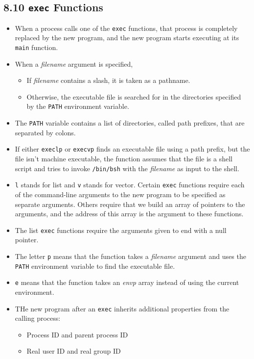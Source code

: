 \documentclass[]{article} \usepackage[all]{xy}
\newcommand{\code}{\texttt}
\begin{document}
\subsection*{8.10 \code{exec} Functions}
\begin{itemize}
\item When a process calls one of the \code{exec} functions, that process is
completely replaced by the new program, and the new program starts executing at
its \code{main} function.
\item When a \emph{filename} argument is specified,
\begin{itemize}
\item If \emph{filename} contains a slash, it is taken as a pathname.
\item Otherwise, the executable file is searched for in the directories
specified by the \code{PATH} environment variable.
\end{itemize}
\item The \code{PATH} variable contains a list of directories, called path
prefixes, that are separated by colons.
\item If either \code{execlp} or \code{execvp} finds an executable file using a
path prefix, but the file isn't machine executable, the function assumes that
the file is a shell script and tries to invoke \code{/bin/bsh} with the
\emph{filename} as input to the shell.
\item \code{l} stands for list and \code{v} stands for vector. Certain
\code{exec} functions require each of the command-line arguments to the new
program to be specified as separate arguments. Others require that we build an
array of pointers to the arguments, and the address of this array is the
argument to these functions.
\item The list \code{exec} functions require the arguments given to end with a
null pointer.
\item The letter \code{p} means that the function takes a \emph{filename}
argument and uses the \code{PATH} environment variable to find the executable
file.
\item \code{e} means that the function takes an \emph{envp\lbrack\rbrack} array
instead of using the current environment.
\item THe new program after an \code{exec} inherits additional properties from
the calling process:
\begin{itemize}
\item Process ID and parent process ID
\item Real user ID and real group ID

\end{itemize}
\end{itemize}
\end{document}
